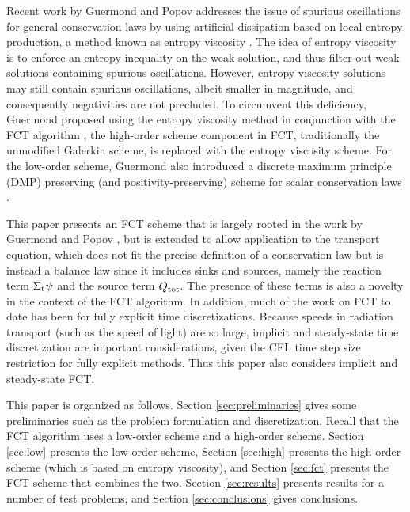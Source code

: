 Recent work by Guermond and Popov addresses the issue of spurious oscillations
for general conservation laws by using artificial dissipation based on
local entropy production, a method known as entropy viscosity \cite{guermond_ev}.
The idea of entropy viscosity is to enforce an entropy inequality on the weak solution,
and thus filter out weak solutions containing spurious oscillations. However,
entropy viscosity solutions may still contain spurious
oscillations, albeit smaller in magnitude, and consequently negativities
are not precluded. To circumvent this deficiency, Guermond proposed using
the entropy viscosity method in conjunction with the FCT
algorithm \cite{guermond_secondorder}; the high-order scheme component in FCT,
traditionally the unmodified Galerkin scheme, is replaced with the entropy
viscosity scheme.
For the low-order
scheme, Guermond also introduced
a discrete maximum principle (DMP) preserving (and positivity-preserving)
scheme for scalar
conservation laws \cite{guermond_firstorder}.

This paper presents an FCT scheme that is largely rooted in the work by Guermond
and Popov , but is extended to allow application to the transport equation,
which does not fit the precise definition of a conservation law but is instead a
balance law since it includes sinks and sources, namely the reaction term
$\Sigma_\textup{t}\psi$ and the source term $Q_\textup{tot}$. The presence
of these terms is also a novelty in the context of the FCT algorithm.
In addition, much of the work on FCT to date has been for fully explicit time
discretizations. Because speeds in radiation transport (such as the speed of light)
are so large, implicit and steady-state time discretization are important
considerations, given the CFL time step size restriction for fully explicit
methods. Thus this paper also considers implicit and steady-state FCT.

This paper is organized as follows. Section \ref{sec:preliminaries} gives
some preliminaries such as the problem formulation and discretization.
Recall that the FCT algorithm uses a low-order scheme and a high-order scheme.
Section \ref{sec:low} presents the low-order scheme, Section \ref{sec:high}
presents the high-order scheme (which is based on entropy viscosity),
and Section \ref{sec:fct} presents the FCT scheme that combines the two. Section
\ref{sec:results} presents results for a number of test problems, and
Section \ref{sec:conclusions} gives conclusions.
